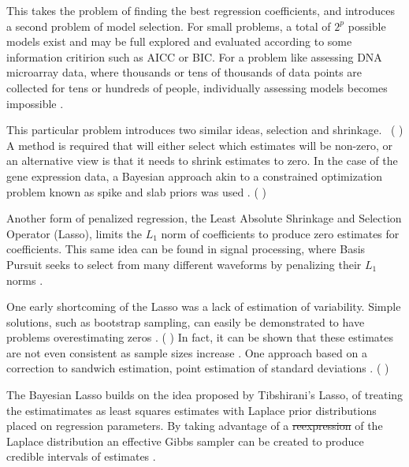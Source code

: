 \documentclass{uwstat572}
\newcommand{\vmdel}[1]{\sout{#1}}
\newcommand{\vmadd}[1]{\textbf{\color{red}{#1}}}
\newcommand{\vmcomment}[1]{({\color{blue}{VM's comment:}} \textbf{\color{blue}{#1}})}
\begin{document}
This takes the problem of finding the best regression coefficients, and introduces a second problem of model selection. For small problems, a total of $2^p$ possible models exist and may be full explored and evaluated according to some information critirion such as AICC or BIC. For a problem like assessing DNA microarray data, where thousands or tens of thousands of data points are collected for tens or hundreds of people, individually assessing models becomes impossible \citep{ishwaran2005spike}.

This particular problem introduces two similar ideas, selection and shrinkage. \
\vmcomment{1) What particular problem?; 2) How can a problem introduce ideas?}
 A method is required that will either select which estimates will be non-zero, or an alternative view is that it needs to shrink estimates to zero. In the case of the gene expression data, a Bayesian approach akin to a constrained optimization problem known as spike and slab priors was used \cite{ishwaran2005spike}. 
 \vmcomment{Explain in words the gist of the idea behind spike and slab priors.}

Another form of penalized regression, the Least Absolute Shrinkage and Selection Operator (Lasso), limits the $L_1$ norm of coefficients to produce zero estimates for \vmadd{some of the} coefficients. 
This same idea can be found in signal processing, where Basis Pursuit seeks to select from many different waveforms by penalizing their $L_1$ norms \citep{chen2001atomic}.

One early shortcoming of the Lasso was a lack of estimation of variability. Simple solutions, such as bootstrap sampling, can easily be demonstrated to have problems overestimating zeros \citep{kyung2010penalized}.
\vmcomment{Do you mean ``overestimating the number of zero coefficients?}
In fact, it can be shown that these estimates are not even consistent as sample sizes increase \citep{shao1996bootstrap}. 
One approach based on a correction to sandwich estimation, point estimation of standard deviations \citep{fan2001variable}. 
\vmcomment{I didn't understand the last sentence --- please re-write.}

The Bayesian Lasso builds on the idea proposed by Tibshirani's Lasso, of treating the estimatimates as least squares estimates with Laplace prior distributions placed on regression parameters. 
By taking advantage of a \vmdel{reexpression} \vmadd{scale mixture of normals representation} of the Laplace distribution an effective Gibbs sampler can be created to produce credible intervals of \vmadd{regression coefficient} estimates \citep{tibshirani1996regression}.
\end{document}

